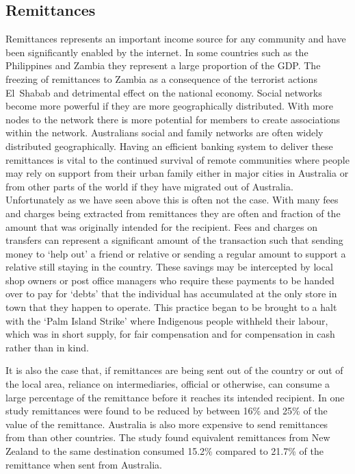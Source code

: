 \subsection{Remittances}
Remittances represents an important income source for any community and have been significantly enabled by the internet.  In some countries such as the Philippines and Zambia they represent a large proportion of the GDP.  The freezing of remittances to Zambia as a consequence of the terrorist actions El~Shabab and detrimental effect on the national economy.  Social networks become more powerful if they are more geographically distributed.  With more nodes to the network there is more potential for members to create associations within the network.  Australians social and family networks are often widely distributed geographically.  Having an efficient banking system to deliver these remittances is vital to the continued survival of remote communities where people may rely on support from their urban family either in major cities in Australia or from other parts of the world if they have migrated out of Australia.  Unfortunately as we have seen above this is often not the case.  With many fees and charges being extracted from remittances they are often and fraction of the amount that was originally intended for the recipient. Fees and charges on transfers can represent a significant amount of the transaction such that sending money to `help out' a friend or relative or sending a regular amount to support a relative still staying in the country. These savings may be intercepted by local shop owners or post office managers who require these payments to be handed over to pay for `debts' that the individual has accumulated at the only store in town that they happen to operate. This practice began to be brought to a halt with the `Palm Island Strike' where Indigenous people withheld their labour, which was in short supply, for fair compensation and for compensation in cash rather than in kind\cite{RefWorks:291}.

It is also the case that, if remittances are being sent out of the country or out of the local area, reliance on intermediaries, official or otherwise, can consume a large percentage of the remittance before it reaches its intended recipient. In one study remittances were found to be reduced by between 16\% and 25\% of the value of the remittance\cite[p8]{RefWorks:290}. Australia is also more expensive to send remittances from than other countries. The study found equivalent remittances from New Zealand to the same destination consumed 15.2\% compared to 21.7\% of the remittance when sent from Australia\cite[p15]{RefWorks:290}.




